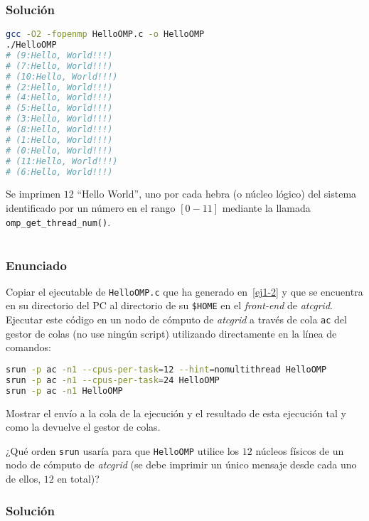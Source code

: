 \pagebreak

\subsubsection{Solución}

\begin{lstlisting}[language=sh]
gcc -O2 -fopenmp HelloOMP.c -o HelloOMP
./HelloOMP
# (9:Hello, World!!!)
# (7:Hello, World!!!)
# (10:Hello, World!!!)
# (2:Hello, World!!!)
# (4:Hello, World!!!)
# (5:Hello, World!!!)
# (3:Hello, World!!!)
# (8:Hello, World!!!)
# (1:Hello, World!!!)
# (0:Hello, World!!!)
# (11:Hello, World!!!)
# (6:Hello, World!!!)
\end{lstlisting}

Se imprimen $12$ ``Hello World'', uno por cada hebra (o núcleo lógico) del sistema identificado por un número en el rango $[0-11]$ mediante la llamada \texttt{omp\_get\_thread\_num()}.

\section{}\label{ej1-3}

\subsubsection{Enunciado}

Copiar el ejecutable de \texttt{HelloOMP.c} que ha generado en~\ref{ej1-2} y que se encuentra en su directorio del PC al directorio de su \texttt{\$HOME} en el \textit{front-end} de \textit{atcgrid}.
Ejecutar este código en un nodo de cómputo de \textit{atcgrid} a través de cola \texttt{ac} del gestor de colas (no use ningún script) utilizando directamente en la línea de comandos:

\begin{lstlisting}[language=sh]
srun -p ac -n1 --cpus-per-task=12 --hint=nomultithread HelloOMP
srun -p ac -n1 --cpus-per-task=24 HelloOMP
srun -p ac -n1 HelloOMP
\end{lstlisting}

Mostrar el envío a la cola de la ejecución y el resultado de esta ejecución tal y como la devuelve el gestor de colas.

¿Qué orden \texttt{srun} usaría para que \texttt{HelloOMP} utilice los $12$ núcleos físicos de un nodo de cómputo de \textit{atcgrid} (se debe imprimir un único mensaje desde cada uno de ellos, $12$ en total)?

\subsubsection{Solución}


